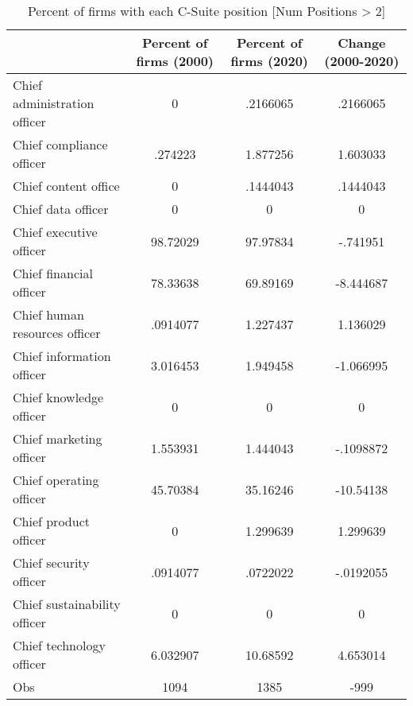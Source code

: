 \begin{table}[htbp]\centering
\caption{Percent of firms with each C-Suite position [Num Positions > 2]\label{tab98}}
\begin{tabular}{l*{3}{c}}
\toprule
                    &Percent of firms (2000)&Percent of firms (2020)&Change (2000-2020)\\
\midrule
Chief administration officer&           0&    .2166065&    .2166065\\
Chief compliance officer&     .274223&    1.877256&    1.603033\\
Chief content office&           0&    .1444043&    .1444043\\
Chief data officer  &           0&           0&           0\\
Chief executive officer&    98.72029&    97.97834&    -.741951\\
Chief financial officer&    78.33638&    69.89169&   -8.444687\\
Chief human resources officer&    .0914077&    1.227437&    1.136029\\
Chief information officer&    3.016453&    1.949458&   -1.066995\\
Chief knowledge officer&           0&           0&           0\\
Chief marketing officer&    1.553931&    1.444043&   -.1098872\\
Chief operating officer&    45.70384&    35.16246&   -10.54138\\
Chief product officer&           0&    1.299639&    1.299639\\
Chief security officer&    .0914077&    .0722022&   -.0192055\\
Chief sustainability officer&           0&           0&           0\\
Chief technology officer&    6.032907&    10.68592&    4.653014\\
Obs                 &        1094&        1385&        -999\\
\bottomrule
\end{tabular}
\end{table}
